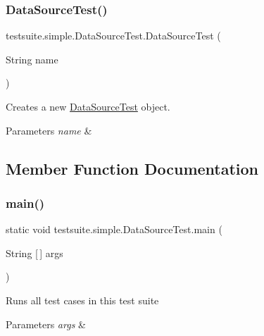 \subsubsection{\texorpdfstring{Data\+Source\+Test()}{DataSourceTest()}}
{\footnotesize\ttfamily testsuite.\+simple.\+Data\+Source\+Test.\+Data\+Source\+Test (\begin{DoxyParamCaption}\item[{String}]{name }\end{DoxyParamCaption})}

Creates a new \mbox{\hyperlink{classtestsuite_1_1simple_1_1_data_source_test}{Data\+Source\+Test}} object.


\begin{DoxyParams}{Parameters}
{\em name} & \\
\hline
\end{DoxyParams}


\subsection{Member Function Documentation}
\mbox{\label{classtestsuite_1_1simple_1_1_data_source_test_a0cca4d619b5b552e16eb9332c191ce5f}} 
\subsubsection{\texorpdfstring{main()}{main()}}
{\footnotesize\ttfamily static void testsuite.\+simple.\+Data\+Source\+Test.\+main (\begin{DoxyParamCaption}\item[{String \mbox{[}$\,$\mbox{]}}]{args }\end{DoxyParamCaption})\hspace{0.3cm}{\ttfamily [static]}}

Runs all test cases in this test suite


\begin{DoxyParams}{Parameters}
{\em args} & \\
\hline
\end{DoxyParams}
\mbox{\label{classtestsuite_1_1simple_1_1_data_source_test_af972007f4b839815702c12a48fc1b77d}} 
